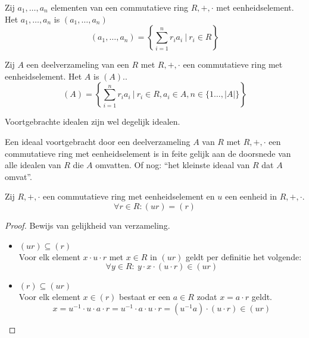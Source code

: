 \documentclass[main.tex]{subfiles}
\begin{document}
\begin{de}
  Zij $a_{1},\dotsc,a_{n}$ elementen van een commutatieve ring $R,+,\cdot$ met eenheidselement.
  Het  $a_{1},\dotsc,a_{n}$ is $(a_{1},\dotsc,a_{n})$
  \[ (a_{1},\dotsc,a_{n}) = \left\{ \sum_{i=1}^{n}r_{i}a_{i} \ |\ r_{i} \in R \right\} \]
\end{de}

\begin{de}
  Zij $A$ een deelverzameling van een $R$ met $R,+,\cdot$ een commutatieve ring met eenheidselement.
  Het  $A$ is $(A)$..
  \[ (A) = \left\{ \sum_{i=1}^{n}r_{i}a_{i} \ |\ r_{i} \in R, a_{i} \in A, n\in \{1 \dotsc, |A|\} \right\}\]
\end{de}

\begin{st}
  Voortgebrachte idealen zijn wel degelijk idealen.
\end{st}

\begin{opm}
  Een ideaal voortgebracht door een deelverzameling $A$ van $R$ met $R,+,\cdot$ een commutatieve ring met eenheidselement is in feite gelijk aan de doorsnede van alle idealen van $R$ die $A$ omvatten.
  Of nog: ``het kleinste ideaal van $R$ dat $A$ omvat''.
\end{opm}

\begin{st}
  Zij $R,+,\cdot$ een commutatieve ring met eenheidselement en $u$ een eenheid in $R,+,\cdot$.
  \[ \forall r\in R: (ur) = (r) \]

  \begin{proof}
    Bewijs van gelijkheid van verzameling.
    \begin{itemize}
    \item $(ur) \subseteq (r)$\\
      Voor elk element $x\cdot u \cdot r$ met $x\in R$ in $(ur)$ geldt per definitie het volgende:
      \[ \forall y\in R:\ y \cdot x \cdot (u \cdot r) \in (ur) \]
    \item $(r) \subseteq (ur)$\\
      Voor elk element $x\in (r)$ bestaat er een $a\in R$ zodat $x=a\cdot r$ geldt.
      \[ x = u^{-1}\cdot u \cdot a \cdot r = u^{-1}\cdot a \cdot u \cdot r = (u^{-1}a)\cdot (u\cdot r) \in (ur) \]
    \end{itemize}
  \end{proof}
\end{st}
\end{document}
